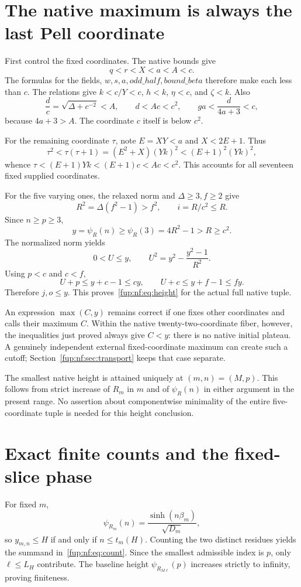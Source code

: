 \documentclass[11pt,letterpaper]{article}
\theoremstyle{definition}\newtheorem{definition}[theorem]{Definition}
\theoremstyle{remark}\newtheorem{remark}[theorem]{Remark}
\begin{document}
\section{The native maximum is always the last Pell coordinate}\label{fup:nf:sec:height}
First control the fixed coordinates. The native bounds give
\[
 q<r<X<a<A<c.
\]
The formulas for the fields, $w,s,a,\mathit{odd\_half},\mathit{bound\_beta}$ therefore make each less than $c$. The relations give $k<c/Y<c$, $h<k$, $\eta<c$, and $\zeta<k$. Also
\[
 \frac dc=\sqrt{\Delta+c^{-2}}<A,
 \qquad d<Ac<c^2,
 \qquad \mathit{ga}<\frac d{4a+3}<c,
\]
because $4a+3>A$. The coordinate $c$ itself is below $c^2$.

For the remaining coordinate $\tau$, note $E=XY<a$ and $X<2E+1$. Thus
\[
 \tau^2<\tau(\tau+1)=(E^2+X)(Yk)^2<(E+1)^2(Yk)^2,
\]
whence $\tau<(E+1)Yk<(E+1)c<Ac<c^2$. This accounts for all seventeen fixed supplied coordinates.

For the five varying ones, the relaxed norm and $\Delta\ge3,f\ge2$ give
\[
 R^2=\Delta(f^2-1)>f^2,
 \qquad i=R/c^2\le R.
\]
Since $n\ge p\ge3$,
\[
 y=\psi_R(n)\ge\psi_R(3)=4R^2-1>R\ge c^2.
\]
The normalized norm yields
\[
 0<U\le y,\qquad
 U^2=y^2-\frac{y^2-1}{R^2}.
\]
Using $p<c$ and $c<f$,
\[
 U+p\le y+c-1\le cy,\qquad
 U+c\le y+f-1\le fy.
\]
Therefore $j,o\le y$. This proves~\eqref{fup:nf:eq:height} for the actual full native tuple.

An expression $\max(C,y)$ remains correct if one fixes other coordinates and calls their maximum $C$. Within the native twenty-two-coordinate fiber, however, the inequalities just proved always give $C<y$: there is no native initial plateau. A genuinely independent external fixed-coordinate maximum can create such a cutoff; Section~\ref{fup:nf:sec:transport} keeps that case separate.

The smallest native height is attained uniquely at $(m,n)=(M,p)$. This follows from strict increase of $R_m$ in $m$ and of $\psi_R(n)$ in either argument in the present range. No assertion about componentwise minimality of the entire five-coordinate tuple is needed for this height conclusion.

\section{Exact finite counts and the fixed-slice phase}\label{fup:nf:sec:finite}
For fixed $m$,
\[
 \psi_{R_m}(n)=\frac{\sinh(n\beta_m)}{\sqrt{D_m}},
\]
so $y_{m,n}\le H$ if and only if $n\le t_m(H)$. Counting the two distinct residues yields the summand in~\eqref{fup:nf:eq:count}. Since the smallest admissible index is $p$, only $\ell\le L_H$ contribute. The baseline height $\psi_{R_{M\ell}}(p)$ increases strictly to infinity, proving finiteness.
\end{document}

